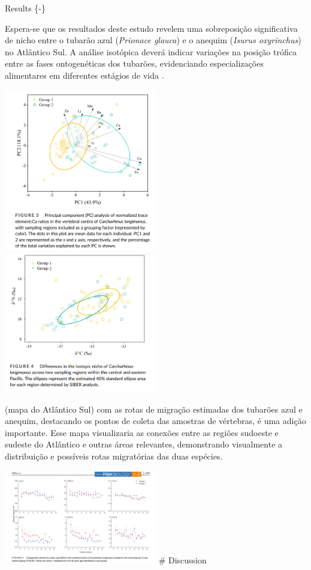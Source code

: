\documentclass[utf8]{FrontiersinHarvard}
\begin{document}
Results \{-\}

Espera-se que os resultados deste estudo revelem uma sobreposição
significativa de nicho entre o tubarão azul (\emph{Prionace glauca}) e o
anequim (\emph{Isurus oxyrinchus}) no Atlântico Sul. A análise isotópica
deverá indicar variações na posição trófica entre as fases ontogenéticas
dos tubarões, evidenciando especializações alimentares em diferentes
estágios de vida \citep{Carlisle2015, Estrada2006}.

\includegraphics[width=0.5\textwidth,height=\textheight]{grupo2.png}
\includegraphics[width=0.5\textwidth,height=\textheight]{group22.png}

(mapa do Atlântico Sul) com as rotas de migração estimadas dos tubarões
azul e anequim, destacando os pontos de coleta das amostras de
vértebras, é uma adição importante. Esse mapa visualizaria as conexões
entre as regiões sudoeste e sudeste do Atlântico e outras áreas
relevantes, demonstrando visualmente a distribuição e possíveis rotas
migratórias das duas espécies.

\includegraphics[width=0.5\textwidth,height=\textheight]{group23.png} \#
Discussion
\end{document}
